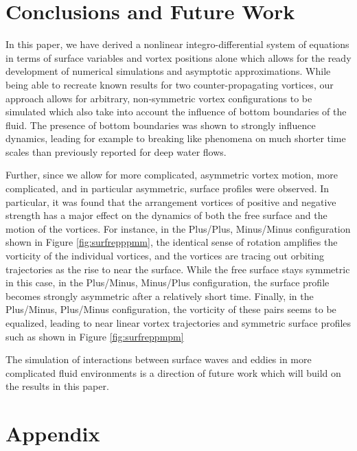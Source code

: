 \documentclass[a4paper,11pt]{article}
\begin{document}
\section{Conclusions and Future Work}
In this paper, we have derived a nonlinear integro-differential system of equations in terms of surface variables and vortex positions alone which allows for the ready development of numerical simulations and asymptotic approximations.  While being able to recreate known results for two counter-propagating vortices, our approach allows for arbitrary, non-symmetric vortex configurations to be simulated which also take into account the influence of bottom boundaries of the fluid. The presence of bottom boundaries was shown to strongly influence dynamics, leading for example to breaking like phenomena on much shorter time scales than previously reported for deep water flows.  

Further, since we allow for more complicated, asymmetric vortex motion, more complicated, and in particular asymmetric, surface profiles were observed. In particular, it was found that the arrangement vortices of positive and negative
strength has a major effect on the dynamics of both the free surface and the motion of the vortices.
For instance, in the Plus/Plus, Minus/Minus configuration shown in Figure \ref{fig:surfrepppmm}, 
the identical sense of rotation amplifies the vorticity of the individual vortices,
and the vortices are tracing out orbiting trajectories as the rise to near the surface.
While the free surface stays symmetric in this case, 
in the Plus/Minus, Minus/Plus configuration, 
the surface profile becomes strongly asymmetric after a relatively short time.
Finally, in the Plus/Minus, Plus/Minus configuration, 
the vorticity of these pairs seems to be equalized,
leading to near linear vortex trajectories 
and symmetric surface profiles such as shown in Figure \ref{fig:surfreppmpm}

The simulation of interactions between surface waves and eddies in more complicated 
fluid environments is a direction of future work which will build on the results in this paper.        
\section{Appendix}
\end{document}
